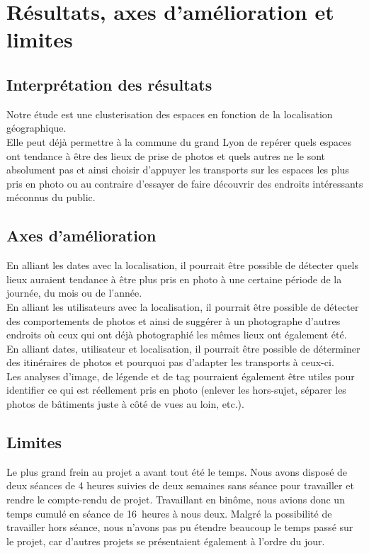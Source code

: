 \chapter{Résultats, axes d'amélioration et limites}
\section{Interprétation des résultats}

Notre étude est une clusterisation des espaces en fonction de la localisation géographique.
\\

Elle peut déjà permettre à la commune du grand Lyon de repérer quels espaces ont tendance à être des lieux de prise de photos et quels autres ne le sont absolument pas et ainsi choisir d'appuyer les transports sur les espaces les plus pris en photo ou au contraire d'essayer de faire découvrir des endroits intéressants méconnus du public.

\section{Axes d'amélioration}
En alliant les dates avec la localisation, il pourrait être possible de détecter quels lieux auraient tendance à être plus pris en photo à une certaine période de la journée, du mois ou de l'année.
\\

En alliant les utilisateurs avec la localisation, il pourrait être possible de détecter des comportements de photos et ainsi de suggérer à un photographe d'autres endroits où ceux qui ont déjà photographié les mêmes lieux ont également été.
\\

En alliant dates, utilisateur et localisation, il pourrait être possible de déterminer des itinéraires de photos et pourquoi pas d'adapter les transports à ceux-ci.
\\

Les analyses d'image, de légende et de tag pourraient également être utiles pour identifier ce qui est réellement pris en photo (enlever les hors-sujet, séparer les photos de bâtiments juste à côté de vues au loin, etc.).

\section{Limites}
Le plus grand frein au projet a avant tout été le temps. Nous avons disposé de deux séances de 4 heures suivies de deux semaines sans séance pour travailler et rendre le compte-rendu de projet. 
Travaillant en binôme, nous avions donc un temps cumulé en séance de 16~heures à nous deux. Malgré la possibilité de travailler hors séance, nous n'avons pas pu étendre beaucoup le temps passé sur le projet, car d'autres projets se présentaient également à l'ordre du jour.
\\

